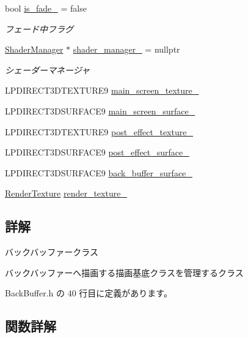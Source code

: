 \begin{DoxyCompactItemize}
bool \mbox{\hyperlink{class_back_buffer_aad2e68ea6dadf332f16f16817c5f2cee}{is\+\_\+fade\+\_\+}} = false
\begin{DoxyCompactList}\small\item\em フェード中フラグ \end{DoxyCompactList}\item 
\mbox{\hyperlink{class_shader_manager}{Shader\+Manager}} $\ast$ \mbox{\hyperlink{class_back_buffer_a559b286c9e1803110daddca158704696}{shader\+\_\+manager\+\_\+}} = nullptr
\begin{DoxyCompactList}\small\item\em シェーダーマネージャ \end{DoxyCompactList}\item 
L\+P\+D\+I\+R\+E\+C\+T3\+D\+T\+E\+X\+T\+U\+R\+E9 \mbox{\hyperlink{class_back_buffer_a21ad537226411134ca4c0118e8d6c3d4}{main\+\_\+screen\+\_\+texture\+\_\+}}
\item 
L\+P\+D\+I\+R\+E\+C\+T3\+D\+S\+U\+R\+F\+A\+C\+E9 \mbox{\hyperlink{class_back_buffer_a434393d545a046fa27231a1c406e7de4}{main\+\_\+screen\+\_\+surface\+\_\+}}
\item 
L\+P\+D\+I\+R\+E\+C\+T3\+D\+T\+E\+X\+T\+U\+R\+E9 \mbox{\hyperlink{class_back_buffer_a4992ca15e78878793d5186d7177a3340}{post\+\_\+effect\+\_\+texture\+\_\+}}
\item 
L\+P\+D\+I\+R\+E\+C\+T3\+D\+S\+U\+R\+F\+A\+C\+E9 \mbox{\hyperlink{class_back_buffer_a7d6fc6ed726ae6f2df7ee1965ee69643}{post\+\_\+effect\+\_\+surface\+\_\+}}
\item 
L\+P\+D\+I\+R\+E\+C\+T3\+D\+S\+U\+R\+F\+A\+C\+E9 \mbox{\hyperlink{class_back_buffer_acc273c3214708a28dbd60a6adbb793e8}{back\+\_\+buffer\+\_\+surface\+\_\+}}
\item 
\mbox{\hyperlink{class_render_texture}{Render\+Texture}} \mbox{\hyperlink{class_back_buffer_ae6040bcf1ad445c54527b6d094453560}{render\+\_\+texture\+\_\+}}
\end{DoxyCompactItemize}


\subsection{詳解}
バックバッファークラス 

バックバッファーへ描画する描画基底クラスを管理するクラス 

 Back\+Buffer.\+h の 40 行目に定義があります。



\subsection{関数詳解}
\mbox{\label{class_back_buffer_ab9cae17a69086b467f6e016e432b224b}} 
